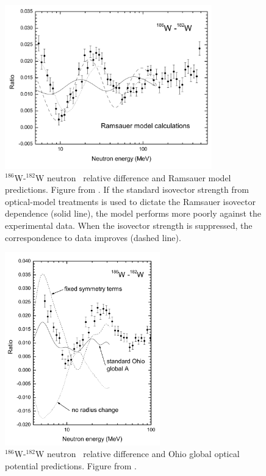\begin{figure}[tb]
    \centering
    \includegraphics[width=0.8\textwidth]{figures/Dietrich2003_RamsauerPotential.png}
    \caption[$^{186}$W-$^{182}$W neutron \tot\ relative difference and
    Ramsauer model predictions]
    {
        $^{186}$W-$^{182}$W neutron \tot\ relative difference and
        Ramsauer model predictions. Figure from \cite{Dietrich2003}.
        If the standard isovector strength from
        optical-model treatments is used to dictate the Ramsauer isovector
        dependence (solid line), the model performs more poorly against the experimental
        data. When the isovector strength is suppressed, the correspondence to data improves (dashed
        line).
    }
    \label{Dietrich2003_Ramsauer}
\end{figure}

\begin{figure}[tb]
    \centering
    \includegraphics[width=0.6\textwidth]{figures/Dietrich2003_OhioPotential.png}
    \caption[$^{186}$W-$^{182}$W neutron \tot\ relative difference and
    Ohio global optical model predictions]
    {
        $^{186}$W-$^{182}$W neutron \tot\ relative difference and
        Ohio global optical potential predictions. Figure from \cite{Dietrich2003}.
    }
    \label{Dietrich2003_Ohio}
\end{figure}

